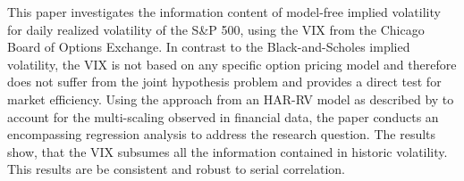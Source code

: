 
This paper investigates the information content of model-free implied volatility for daily realized volatility of the S\&P 500, using the VIX from the Chicago Board of Options Exchange. In contrast to the Black-and-Scholes implied volatility, the VIX is not based on any specific option pricing model and therefore does not suffer from the joint hypothesis problem and provides a direct test for market efficiency. Using the approach from an HAR-RV model as described by \textcite{corsi2009} to account for the multi-scaling observed  in financial data, the paper conducts an encompassing regression analysis to address the research question. The results show, that the VIX subsumes all the information contained in historic volatility. This results are be consistent and robust to serial correlation.